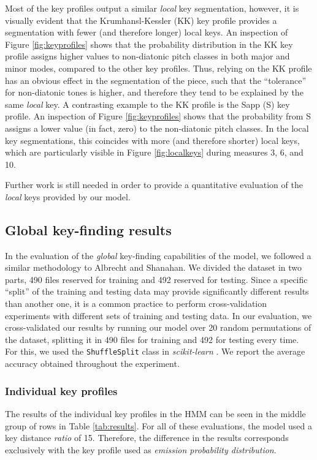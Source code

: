 \documentclass[sigconf]{acmart}
\begin{document}
Most of the key profiles output a similar \emph{local} key segmentation, however, it is visually evident that the Krumhansl-Kessler (KK) key profile provides a segmentation with fewer (and therefore longer) local keys.
An inspection of Figure \ref{fig:keyprofiles} shows that the probability distribution in the KK key profile assigns higher values to non-diatonic pitch classes in both major and minor modes, compared to the other key profiles. Thus, relying on the KK profile has an obvious effect in the segmentation of the piece, such that the ``tolerance'' for non-diatonic tones is higher, and therefore they tend to be explained by the same \emph{local} key. A contrasting example to the KK profile is the Sapp (S) key profile. An inspection of Figure \ref{fig:keyprofiles} shows that the probability from S assigns a lower value (in fact, zero) to the non-diatonic pitch classes. In the local key segmentations, this coincides with more (and therefore shorter) local keys, which are particularly visible in Figure \ref{fig:localkeys} during measures 3, 6, and 10.

Further work is still needed in order to provide a quantitative evaluation of the \emph{local} keys provided by our model.

\subsection{Global key-finding results}
In the evaluation of the \emph{global} key-finding capabilities of the model, we followed a similar methodology to Albrecht and Shanahan. We divided the dataset in two parts, 490 files reserved for training and 492 reserved for testing. Since a specific ``split'' of the training and testing data may provide significantly different results than another one, it is a common practice to perform cross-validation experiments with different sets of training and testing data. In our evaluation, we cross-validated our results by running our model over 20 random permutations of the dataset, splitting it in 490 files for training and 492 for testing every time. For this, we used the \texttt{ShuffleSplit} class in \emph{scikit-learn} \cite{pedregosa2011}. We report the average accuracy obtained throughout the experiment.

\subsubsection{Individual key profiles}
The results of the individual key profiles in the HMM can be seen in the middle group of rows in Table \ref{tab:results}. For all of these evaluations, the model used a key distance \emph{ratio} of 15. Therefore, the difference in the results corresponds exclusively with the key profile used as \emph{emission probability distribution}.
\end{document}
